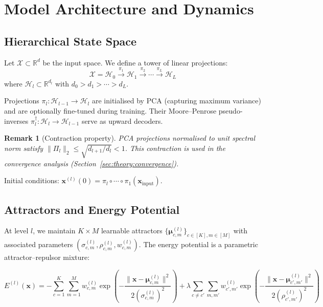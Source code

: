\documentclass[11pt,a4paper]{article}
\newtheorem{remark}[theorem]{Remark}
\begin{document}
\section{Model Architecture and Dynamics}

\subsection{Hierarchical State Space}

Let $\mathcal{X} \subset \mathbb{R}^d$ be the input space. We define a tower of linear
projections:
\begin{equation}
  \mathcal{X} = \mathcal{H}_0
  \xrightarrow{\pi_1} \mathcal{H}_1
  \xrightarrow{\pi_2} \cdots
  \xrightarrow{\pi_L} \mathcal{H}_L
\end{equation}
where $\mathcal{H}_l \subset \mathbb{R}^{d_l}$ with $d_0 > d_1 > \cdots > d_L$.

Projections $\pi_l : \mathcal{H}_{l-1} \to \mathcal{H}_l$ are initialised by PCA (capturing
maximum variance) and are optionally fine-tuned during training. Their Moore--Penrose
pseudo-inverses $\pi_l^\dagger : \mathcal{H}_l \to \mathcal{H}_{l-1}$ serve as upward
decoders.

\begin{remark}[Contraction property]
PCA projections normalised to unit spectral norm satisfy
$\|\Pi_l\|_2 \le \sqrt{d_{l+1}/d_l} < 1$.
This contraction is used in the convergence analysis (Section~\ref{sec:theory:convergence}).
\end{remark}

Initial conditions: $\mathbf{x}^{(l)}(0) = \pi_l \circ \cdots \circ \pi_1(\mathbf{x}_{\mathrm{input}})$.

\subsection{Attractors and Energy Potential}

At level $l$, we maintain $K \times M$ learnable attractors
$\{\boldsymbol{\mu}^{(l)}_{c,m}\}_{c \in [K], m \in [M]}$
with associated parameters $(\sigma^{(l)}_{c,m}, \rho^{(l)}_{c,m}, w^{(l)}_{c,m})$.
The energy potential is a parametric attractor--repulsor mixture:

\begin{equation}
  E^{(l)}(\mathbf{x}) = -\sum_{c=1}^{K} \sum_{m=1}^{M} w_{c,m}^{(l)}
    \exp\!\left(-\frac{\|\mathbf{x} - \boldsymbol{\mu}_{c,m}^{(l)}\|^2}
                      {2(\sigma_{c,m}^{(l)})^2}\right)
  + \lambda \sum_{c \ne c'} \sum_{m,m'} w_{c',m'}^{(l)}
    \exp\!\left(-\frac{\|\mathbf{x} - \boldsymbol{\mu}_{c',m'}^{(l)}\|^2}
                      {2(\rho_{c',m'}^{(l)})^2}\right)
\label{eq:energy}
\end{equation}
\end{document}
